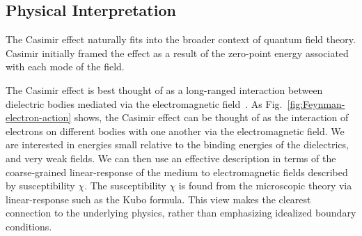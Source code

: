 \subsection{Physical Interpretation}

The Casimir effect naturally fits into the broader context of quantum field theory.  
Casimir initially framed the effect as a result of the zero-point energy associated with each mode of
the field.  

The Casimir effect is best thought of as a long-ranged interaction between dielectric bodies 
mediated via the electromagnetic field~\cite{Jaffe2005, Rahi2009}.
As Fig.~\ref{fig:Feynman-electron-action} shows, the Casimir effect can be thought of as the 
interaction of electrons on different bodies with one another via the electromagnetic field.  
We are interested in energies small relative to the binding energies of the dielectrics, and very weak
fields.  We can then use an effective description in terms of the coarse-grained linear-response of the 
medium to electromagnetic fields described by susceptibility $\chi$.  The susceptibility $\chi$
is found from the microscopic theory via linear-response such as the Kubo formula.
This view makes the clearest connection to the underlying physics, rather than emphasizing idealized
boundary conditions.  


